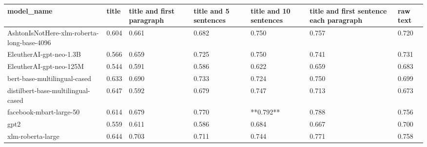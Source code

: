 \begin{tabular}{lllllll}
\toprule
                                model\_name & title & title and first paragraph & title and 5 sentences & title and 10 sentences & title and first sentence each paragraph & raw text \\
\midrule
AshtonIsNotHere-xlm-roberta-long-base-4096 & 0.604 &                     0.661 &                 0.682 &                  0.750 &                                   0.757 &    0.720 \\
                   EleutherAI-gpt-neo-1.3B & 0.566 &                     0.659 &                 0.725 &                  0.750 &                                   0.741 &    0.731 \\
                   EleutherAI-gpt-neo-125M & 0.544 &                     0.591 &                 0.586 &                  0.622 &                                   0.659 &    0.683 \\
              bert-base-multilingual-cased & 0.633 &                     0.690 &                 0.733 &                  0.724 &                                   0.750 &    0.699 \\
        distilbert-base-multilingual-cased & 0.647 &                     0.592 &                 0.679 &                  0.747 &                                   0.713 &    0.673 \\
                   facebook-mbart-large-50 & 0.614 &                     0.679 &                 0.770 &              **0.792** &                                   0.788 &    0.756 \\
                                      gpt2 & 0.559 &                     0.611 &                 0.586 &                  0.684 &                                   0.667 &    0.700 \\
                         xlm-roberta-large & 0.644 &                     0.703 &                 0.711 &                  0.744 &                                   0.771 &    0.758 \\
\bottomrule
\end{tabular}

